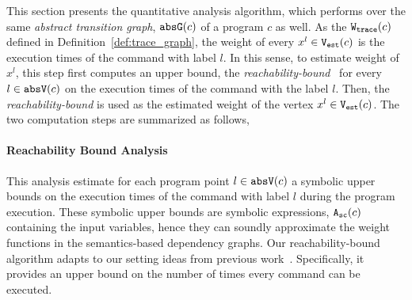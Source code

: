 This section presents the quantitative analysis algorithm, which performs over the same \emph{abstract transition graph}, $\mathtt{abs}{\mathtt{G}}(c)$ of a program $c$ as well. 
As the $\mathtt{{W_{trace}}}(c)$ defined in Definition~\ref{def:trace_graph}, the weight of every $x^l \in \mathtt{{V_{est}}}(c)$ is
the execution times of the command with label $l$. 
In this sense, to estimate weight of $x^l$, this step first computes an upper bound, the \emph{reachability-bound}~\cite{GulwaniZ10} for every $l \in \mathtt{abs}{\mathtt{V}}(c)$
on the execution times of the command with the label $l$. 
Then, the \emph{reachability-bound} is used 
as the estimated weight of the vertex $x^l \in \mathtt{{V_{est}}}(c)$.
The two computation steps are summarized as follows,

\paragraph{Reachability Bound Analysis}
This analysis estimate for each program point $l \in \mathtt{abs}{\mathtt{V}}(c)$ a symbolic upper bounds on the execution times of the command with label $l$ during the program execution.
These symbolic upper bounds are symbolic expressions, ${\mathtt{A_{sc}}}(c)$ containing the input variables,
hence they can soundly approximate the weight functions in the semantics-based dependency graphs. 
Our reachability-bound algorithm adapts to our setting ideas from previous work~\cite{ZulegerGSV11,SinnZV14,SinnZV17}.
Specifically, it provides an upper bound on the number of times every command can be executed.


